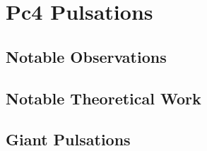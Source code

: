 
\chapter{Pc4 Pulsations}
\label{ch_pc4s}

\section{Notable Observations}




\section{Notable Theoretical Work}


\section{Giant Pulsations}

